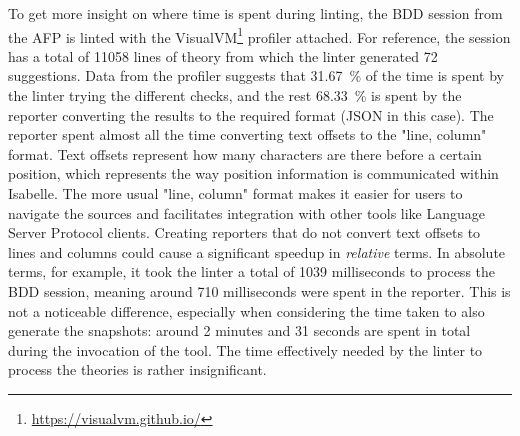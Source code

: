 To get more insight on where time is spent during linting, the BDD
session from the AFP is linted with the VisualVM\footnote{\url{https://visualvm.github.io/}} profiler attached. For reference, the 
session has a total of 11058 lines of theory from which the linter generated
72 suggestions. Data from the profiler suggests that \SI{31.67}{\percent} of the time 
is spent by the linter trying the different checks, and the rest
\SI{68.33}{\percent} is spent by the reporter converting the results to the required
format (JSON in this case). The reporter spent almost all the time 
converting text offsets to the "line, column" format. Text offsets represent
how many characters are there before a certain position,
which represents the way position information is communicated within Isabelle.
The more usual "line, column" format makes it easier for users to navigate
the sources and facilitates integration with other tools 
like Language Server Protocol clients.
Creating reporters that do not convert
text offsets to lines and columns could cause a significant speedup
in \textit{relative} terms. In absolute terms, for example, it took the 
linter
a total of 1039 milliseconds to process the BDD session, meaning
around 710 milliseconds were spent in the reporter. This is not
a noticeable difference, especially when considering the time taken to
also generate the snapshots: around 2 minutes and 31 seconds are spent
in total during the invocation of the tool. The time effectively needed
by the linter to process the theories is rather insignificant.
